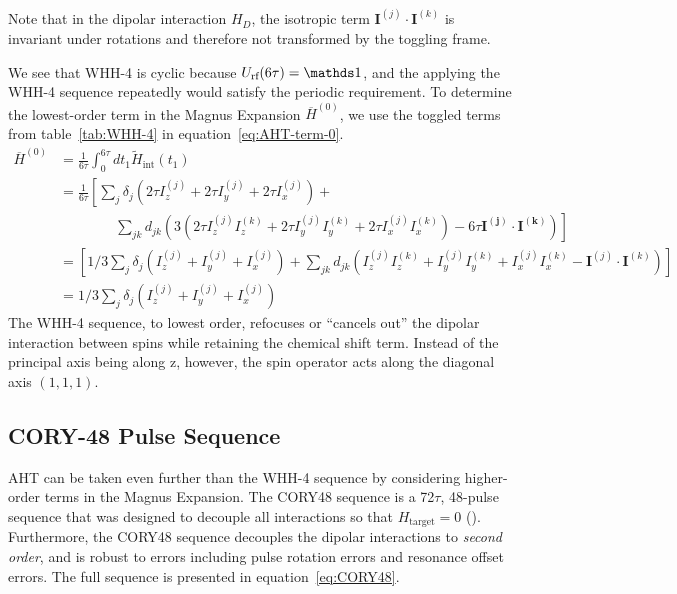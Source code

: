 Note that in the dipolar interaction $H_D$, the isotropic term $\mathbf{I}^{(j)} \cdot \mathbf{I}^{(k)}$ is invariant under rotations and therefore not transformed by the toggling frame.

We see that WHH-4 is cyclic because $U_{\text{rf}}(6\tau) = \identity$, and the applying the WHH-4 sequence repeatedly would satisfy the periodic requirement. To determine the lowest-order term in the Magnus Expansion $\overline{H}^{(0)}$, we use the toggled terms from table~\ref{tab:WHH-4} in equation~\ref{eq:AHT-term-0}.
\begin{align*}
    \overline{H}^{(0)} &= \frac{1}{6\tau} \int_0^{6\tau} dt_1
    \widetilde{H}_{\text{int}}(t_1) \\
    &= \frac{1}{6\tau} \left[
        \sum_j \delta_j \left(2\tau I_z^{(j)} + 2\tau I_y^{(j)} + 2\tau I_x^{(j)} \right) + \right. \\
        & \hspace{4em} \left. \sum_{jk} d_{jk} \left(3(
            2\tau I_z^{(j)}I_z^{(k)} + 2\tau I_y^{(j)}I_y^{(k)} + 2\tau I_x^{(j)}I_x^{(k)}
        ) - 6\tau \mathbf{I^{(j)}} \cdot \mathbf{I^{(k)}} \right)
    \right] \\
    &= \left[
        1/3 \sum_j \delta_j \left(I_z^{(j)} + I_y^{(j)} + I_x^{(j)} \right) +
        \sum_{jk} d_{jk} \left(I_z^{(j)}I_z^{(k)} + I_y^{(j)}I_y^{(k)} + I_x^{(j)}I_x^{(k)} - \mathbf{I}^{(j)} \cdot \mathbf{I}^{(k)} \right)
    \right] \\
    &= 1/3 \sum_j \delta_j \left(I_z^{(j)} + I_y^{(j)} + I_x^{(j)} \right)
\end{align*}
The WHH-4 sequence, to lowest order, refocuses or ``cancels out'' the dipolar interaction between spins while retaining the chemical shift term. Instead of the principal axis being along z, however, the spin operator acts along the diagonal axis $(1,1,1)$.

\subsection{CORY-48 Pulse Sequence}\label{subsec:CORY48}

AHT can be taken even further than the WHH-4 sequence by considering higher-order terms in the Magnus Expansion. The CORY48 sequence is a 72$\tau$, 48-pulse sequence that was designed to decouple all interactions so that $H_{\text{target}} = 0$ (\cite{CORY1990205}). Furthermore, the CORY48 sequence decouples the dipolar interactions to \emph{second order}, and is robust to errors including pulse rotation errors and resonance offset errors. The full sequence is presented in equation~\ref{eq:CORY48}.

